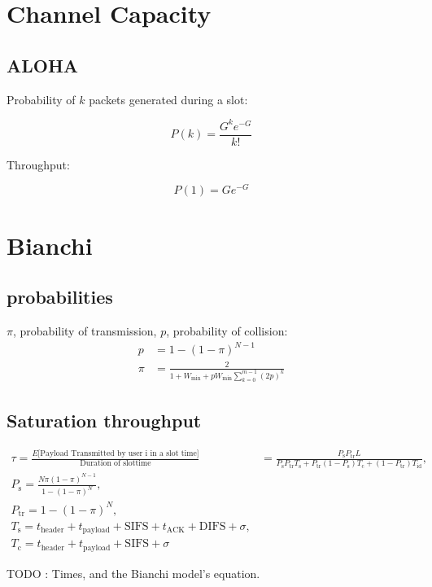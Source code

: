 \documentclass[11pt, a4paper]{scrartcl}
\begin{document}
\section{Channel Capacity}

\subsection{ALOHA}
Probability of $k$ packets generated during a slot:

\begin{equation}
P(k) = \frac{G^ke^{-G}}{k!}
\end{equation}

Throughput:

\begin{equation}
P(1) = Ge^{-G}
\end{equation}

\section{Bianchi}

\subsection{probabilities}
$\pi$, probability of transmission, $p$, probability of collision:
\begin{align}
p &= 1-(1-\pi)^{N-1} \\
\pi &= \frac{2}{ 1 + W_\textrm{min} + pW_\textrm{min}\sum^{m-1}_{k=0}(2p)^k}
\end{align}

\subsection{Saturation throughput}

\begin{align}
 \tau = \frac{E\lbrack\textrm{Payload Transmitted by user i in a slot time}\rbrack}{\textrm{Duration of slottime}} &= \frac{P_\textrm{s}P_{\textrm{tr}}L}{P_\textrm{s}P_{\textrm{tr}}T_{\textrm{s}} + P_\textrm{tr}(1-P_\textrm{s})T_\textrm{c} + (1-P_\textrm{tr})T_\textrm{id}}, \\
 P_\textrm{s} = \frac{N\pi (1-\pi)^{N-1}}{1-(1-\pi)^N}, \\
 P_\textrm{tr} = 1-(1-\pi)^N, \\
 T_\textrm{s} = t_\textrm{header} + t_\textrm{payload} + \textrm{SIFS} + t_\textrm{ACK} + \textrm{DIFS} + \sigma,\\
 T_\textrm{c} = t_\textrm{header} + t_\textrm{payload} + \textrm{SIFS} + \sigma
\end{align}

TODO : Times, and the Bianchi model's equation.
\end{document}
